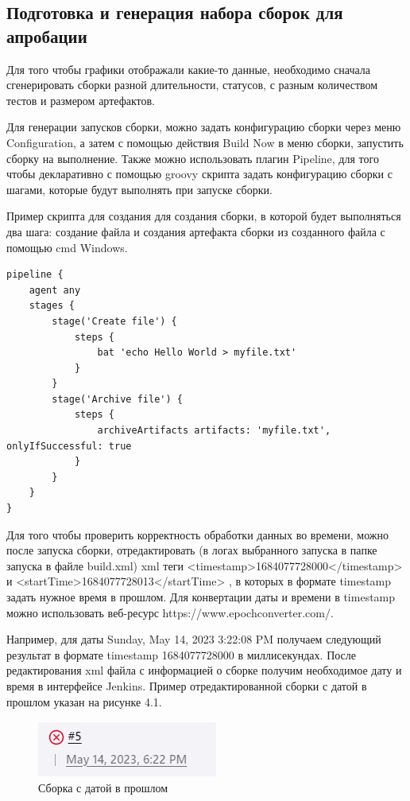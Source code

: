  \subsection{Подготовка и генерация набора сборок для апробации}
 
 Для того чтобы графики отображали какие-то данные, необходимо сначала сгенерировать сборки разной длительности, статусов, с разным количеством тестов и размером артефактов.
 
Для генерации запусков сборки, можно задать конфигурацию сборки через меню Configuration, а затем с помощью действия Build Now в меню сборки, запустить сборку на выполнение. Также можно использовать плагин Pipeline, для того чтобы декларативно с помощью groovy скрипта задать конфигурацию сборки с шагами, которые будут выполнять при запуске сборки. 

Пример скрипта для создания для создания сборки, в которой будет выполняться два шага: создание файла и создания артефакта сборки из созданного файла с помощью cmd Windows.

\begin{lstlisting}
pipeline {
    agent any
    stages {
        stage('Create file') {
            steps {
                bat 'echo Hello World > myfile.txt'
            }
        }
        stage('Archive file') {
            steps {
                archiveArtifacts artifacts: 'myfile.txt', onlyIfSuccessful: true
            }
        }
    }
}
\end{lstlisting}

Для того чтобы проверить корректность обработки данных во времени, можно после запуска сборки, отредактировать (в логах выбранного запуска в папке запуска в файле build.xml) xml теги   <timestamp>1684077728000</timestamp> и
  <startTime>1684077728013</startTime> , в которых в формате timestamp задать нужное время в прошлом. Для конвертации даты и времени в timestamp можно использовать веб-ресурс https://www.epochconverter.com/.
  
Например, для даты Sunday, May 14, 2023 3:22:08 PM получаем следующий результат в формате timestamp 1684077728000 в миллисекундах. После редактирования xml файла с информацией о сборке получим необходимое дату  и время в интерфейсе Jenkins. Пример отредактированной сборки с датой в прошлом указан на рисунке 4.1.

 \begin{figure}[ht!] 
	\center
	\includegraphics [scale=0.87] {my_folder/images//lastBuild}
	\caption{Сборка с датой в прошлом} 
	\label{fig:lastBuild}  
\end{figure}
 

